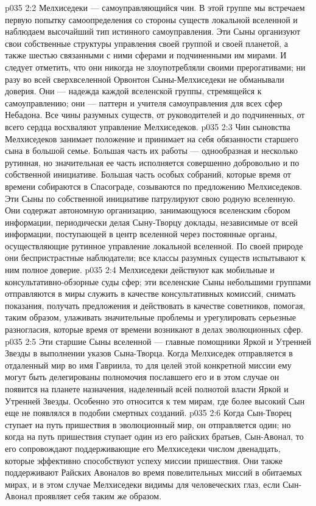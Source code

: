 \vs p035 2:2 Мелхиседеки --- самоуправляющийся чин. В этой группе мы встречаем первую попытку самоопределения со стороны существ локальной вселенной и наблюдаем высочайший тип истинного самоуправления. Эти Сыны организуют свои собственные структуры управления своей группой и своей планетой, а также шестью связанными с ними сферами и подчиненными им мирами. И следует отметить, что они никогда не злоупотребляли своими прерогативами; ни разу во всей сверхвселенной Орвонтон Сыны\hyp{}Мелхиседеки не обманывали доверия. Они --- надежда каждой вселенской группы, стремящейся к самоуправлению; они --- паттерн и учителя самоуправления для всех сфер Небадона. Все чины разумных существ, от руководителей и до подчиненных, от всего сердца восхваляют управление Мелхиседеков.
\vs p035 2:3 \pc Чин сыновства Мелхиседеков занимает положение и принимает на себя обязанности старшего сына в большой семье. Большая часть их работы --- однообразная и несколько рутинная, но значительная ее часть исполняется совершенно добровольно и по собственной инициативе. Большая часть особых собраний, которые время от времени собираются в Спасограде, созываются по предложению Мелхиседеков. Эти Сыны по собственной инициативе патрулируют свою родную вселенную. Они содержат автономную организацию, занимающуюся вселенским сбором информации, периодически делая Сыну\hyp{}Творцу доклады, независимые от всей информации, поступающей в центр вселенной через постоянные органы, осуществляющие рутинное управление локальной вселенной. По своей природе они беспристрастные наблюдатели; все классы разумных существ испытывают к ним полное доверие.
\vs p035 2:4 Мелхиседеки действуют как мобильные и консультативно\hyp{}обзорные суды сфер; эти вселенские Сыны небольшими группами отправляются в миры служить в качестве консультативных комиссий, снимать показания, получать предложения и действовать в качестве советников, помогая, таким образом, улаживать значительные проблемы и урегулировать серьезные разногласия, которые время от времени возникают в делах эволюционных сфер.
\vs p035 2:5 Эти старшие Сыны вселенной --- главные помощники Яркой и Утренней Звезды в выполнении указов Сына\hyp{}Творца. Когда Мелхиседек отправляется в отдаленный мир во имя Гавриила, то для целей этой конкретной миссии ему могут быть делегированы полномочия пославшего его и в этом случае он появится на планете назначения, наделенный всей полнотой власти Яркой и Утренней Звезды. Особенно это относится к тем мирам, где более высокий Сын еще не появлялся в подобии смертных созданий.
\vs p035 2:6 Когда Сын\hyp{}Творец ступает на путь пришествия в эволюционный мир, он отправляется один; но когда на путь пришествия ступает один из его райских братьев, Сын\hyp{}Авонал, то его сопровождают поддерживающие его Мелхиседеки числом двенадцать, которые эффективно способствуют успеху миссии пришествия. Они также поддерживают Райских Авоналов во время повелительных миссий в обитаемых мирах, и в этом случае Мелхиседеки видимы для человеческих глаз, если Сын\hyp{}Авонал проявляет себя таким же образом.
